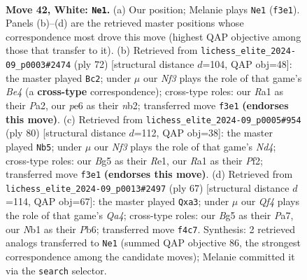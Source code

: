 \documentclass[11pt]{article}
\begin{document}
\clearpage

\begin{figure}[p]\centering
\begin{subfigure}{0.46\textwidth}\centering
\resizebox{\linewidth}{!}{%
\newchessgame
\chessboard[
  setfen={r3k3/6bp/bq2p3/p2p1pB1/P1np1Q1P/5N2/5P2/RNR3K1 w - - 4 42},
  showmover=false,
  pgfstyle=straightmove, color=movearrow, markmove={f3-e1}
]}
\caption{}
\end{subfigure}\hfill
\begin{subfigure}{0.46\textwidth}\centering
\resizebox{\linewidth}{!}{%
\newchessgame
\chessboard[
  setfen={2r1bbk1/3q3p/p3pBp1/4P1Q1/4B3/2p2N1R/Pn3PP1/6K1 w - - 0 37},
  showmover=false,
  pgfstyle=straightmove, color=movearrow, markmove={e4-c2}
]}
\caption{}
\end{subfigure}
\\[4pt]
\begin{subfigure}{0.46\textwidth}\centering
\resizebox{\linewidth}{!}{%
\newchessgame
\chessboard[
  setfen={4r1k1/3qbp2/1p2p1pp/2n5/pBPN4/P6P/1P2QPP1/4R1K1 w - - 1 41},
  showmover=false,
  pgfstyle=straightmove, color=movearrow, markmove={d4-b5}
]}
\caption{}
\end{subfigure}\hfill
\begin{subfigure}{0.46\textwidth}\centering
\resizebox{\linewidth}{!}{%
\newchessgame
\chessboard[
  setfen={k1r1r3/p7/1p1b1pp1/q2Pn2p/3NP3/PQ4PP/4R1K1/BR6 b - - 1 34},
  showmover=false,
  pgfstyle=straightmove, color=movearrow, markmove={a5-a3}
]}
\caption{}
\end{subfigure}
\caption{\textbf{Move 42, White: \texttt{Ne1}.} (a) Our position; Melanie plays \texttt{Ne1} (\texttt{f3e1}). Panels (b)--(d) are the retrieved master positions whose correspondence most drove this move (highest QAP objective among those that transfer to it). (b) Retrieved from \texttt{lichess\_elite\_2024-09\_p0003\#2474} (ply 72) [structural distance $d$=104, QAP obj=48]: the master played \texttt{Bc2}; under $\mu$ our \emph{Nf3} plays the role of that game's \emph{Be4} (a \textbf{cross-type} correspondence); cross-type roles: our \emph{R}a1 as their \emph{P}a2, our \emph{p}e6 as their \emph{n}b2; transferred move \texttt{f3e1} \textbf{(endorses this move)}. (c) Retrieved from \texttt{lichess\_elite\_2024-09\_p0005\#954} (ply 80) [structural distance $d$=112, QAP obj=38]: the master played \texttt{Nb5}; under $\mu$ our \emph{Nf3} plays the role of that game's \emph{Nd4}; cross-type roles: our \emph{B}g5 as their \emph{R}e1, our \emph{R}a1 as their \emph{P}f2; transferred move \texttt{f3e1} \textbf{(endorses this move)}. (d) Retrieved from \texttt{lichess\_elite\_2024-09\_p0013\#2497} (ply 67) [structural distance $d$=114, QAP obj=67]: the master played \texttt{Qxa3}; under $\mu$ our \emph{Qf4} plays the role of that game's \emph{Qa4}; cross-type roles: our \emph{B}g5 as their \emph{P}a7, our \emph{N}b1 as their \emph{P}b6; transferred move \texttt{f4c7}. Synthesis: 2 retrieved analogs transferred to \texttt{Ne1} (summed QAP objective 86, the strongest correspondence among the candidate moves); Melanie committed it via the \texttt{search} selector.}
\label{fig:thought-m82}
\end{figure}
\end{document}
